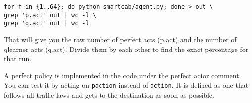 \documentclass[11pt]{article}
\begin{document}
\begin{lstlisting}
for f in {1..64}; do python smartcab/agent.py; done > out \
grep 'p.act' out | wc -l \
grep 'q.act' out | wc -l
\end{lstlisting}

That will give you the raw number of perfect acts (p.act) and the number of qlearner acts (q.act). Divide them by each other to find the exact percentage for that run.

A perfect policy is implemented in the code under the perfect actor comment. You can test it by acting on \texttt{paction} instead of \texttt{action}. It is defined as one that follows all traffic laws and gets to the destination as soon as possible.
\end{document}
